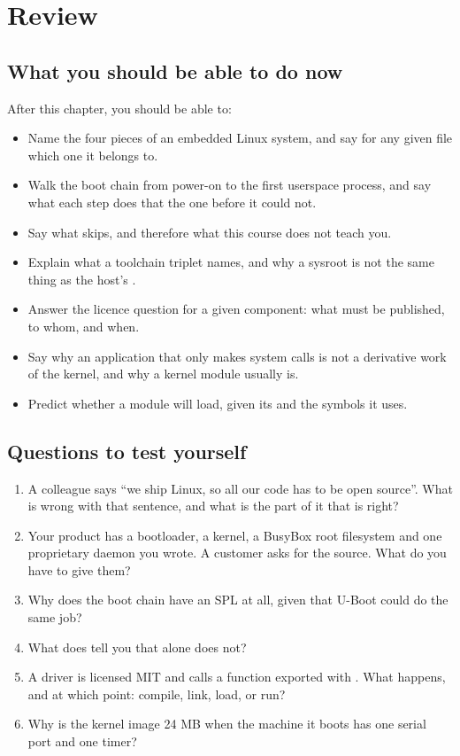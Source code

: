 
\section{Review}
\label{c1:sec:review}

\subsection*{What you should be able to do now}
After this chapter, you should be able to:
\begin{itemize}
  \item Name the four pieces of an embedded Linux system, and say for any given file which one it
    belongs to.
  \item Walk the boot chain from power-on to the first userspace process, and say what each step
    does that the one before it could not.
  \item Say what  skips, and therefore what this course does not teach you.
  \item Explain what a toolchain triplet names, and why a sysroot is not the same thing as the
    host's .
  \item Answer the licence question for a given component: what must be published, to whom, and
    when.
  \item Say why an application that only makes system calls is not a derivative work of the kernel,
    and why a kernel module usually is.
  \item Predict whether a module will load, given its  and the symbols it uses.
\end{itemize}

\subsection*{Questions to test yourself}
\begin{enumerate}
  \item A colleague says ``we ship Linux, so all our code has to be open source''. What is wrong
    with that sentence, and what is the part of it that is right?
  \item Your product has a bootloader, a kernel, a BusyBox root filesystem and one proprietary
    daemon you wrote. A customer asks for the source. What do you have to give them?
  \item Why does the boot chain have an SPL at all, given that U-Boot could do the same job?
  \item What does  tell you that  alone does not?
  \item A driver is licensed MIT and calls a function exported with . What
    happens, and at which point: compile, link, load, or run?
  \item Why is the kernel image 24 MB when the machine it boots has one serial port and one timer?
\end{enumerate}


